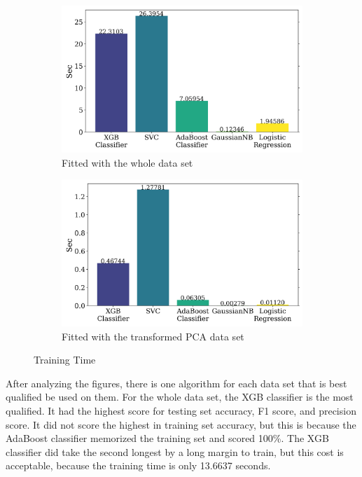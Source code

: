 \documentclass{article}
\begin{document}
\begin{figure}[H]
    \centering
    \begin{subfigure}[t]{0.495\textwidth}
        \centering
        \includegraphics[width=\textwidth]{supporting_images/time_notpca.png}
        \caption{Fitted with the whole data set}
        \label{fig:time_notpca}
    \end{subfigure}
    \hfill
    \begin{subfigure}[t]{0.495\textwidth}
        \centering
        \includegraphics[width=\textwidth]{supporting_images/time_pca.png}
        \caption{Fitted with the transformed PCA data set}
        \label{fig:time_pca}
    \end{subfigure}
    \caption{Training Time}
    \label{fig:time}
\end{figure}

\par
After analyzing the figures, there is one algorithm for each data set that is best qualified be used on them. For the whole data set, the XGB classifier is the most qualified. It had the highest score for testing set accuracy, F1 score, and precision score. It did not score the highest in training set accuracy, but this is because the AdaBoost classifier memorized the training set and scored 100\%. The XGB classifier did take the second longest by a long margin to train, but this cost is acceptable, because the training time is only 13.6637 seconds.
\end{document}

